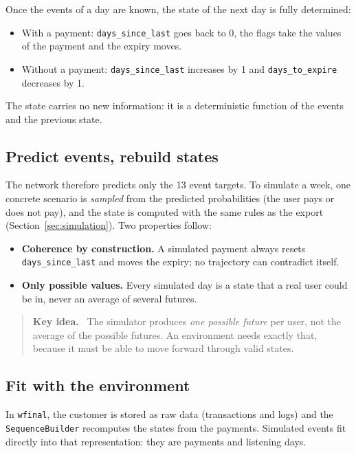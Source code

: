 \documentclass[11pt]{article}
\newcommand{\code}[1]{\texttt{#1}}
\newenvironment{idea}{\begin{quote}\small\color{black!75}\textbf{Key idea.}~}{\end{quote}}
\begin{document}
Once the events of a day are known, the state of the next day is fully determined:
\begin{itemize}
  \item With a payment: \code{days\_since\_last} goes back to 0, the flags take the values of the payment and the expiry moves.
  \item Without a payment: \code{days\_since\_last} increases by 1 and \code{days\_to\_expire} decreases by 1.
\end{itemize}
The state carries no new information: it is a deterministic function of the events and the previous state.

\subsection{Predict events, rebuild states}

The network therefore predicts only the 13 event targets. To simulate a week, one concrete scenario is \emph{sampled} from the predicted probabilities (the user pays or does not pay), and the state is computed with the same rules as the export (Section~\ref{sec:simulation}). Two properties follow:

\begin{itemize}
  \item \textbf{Coherence by construction.} A simulated payment always resets \code{days\_since\_last} and moves the expiry; no trajectory can contradict itself.
  \item \textbf{Only possible values.} Every simulated day is a state that a real user could be in, never an average of several futures.
\end{itemize}

\begin{idea}
The simulator produces \emph{one possible future} per user, not the average of the possible futures. An environment needs exactly that, because it must be able to move forward through valid states.
\end{idea}

\subsection{Fit with the environment}

In \code{wfinal}, the customer is stored as raw data (transactions and logs) and the \code{SequenceBuilder} recomputes the states from the payments. Simulated events fit directly into that representation: they are payments and listening days.
\end{document}
